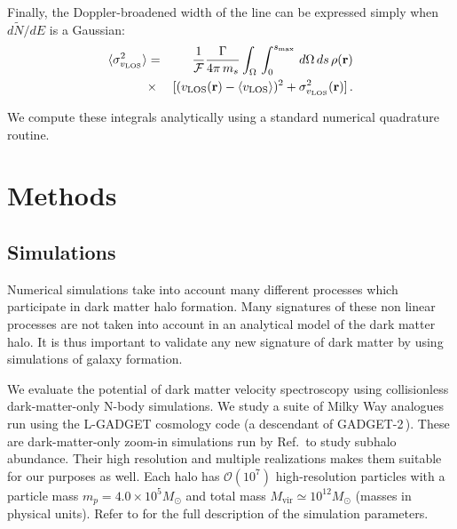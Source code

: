 \documentclass[aps,prd,10pt,twocolumn,superscriptaddress,showpacs,footinbib]{revtex4-1}
\newcommand{\br}[0]{\mathbf{r}}
\newcommand{\los}[0]{\mathrm{LOS}}
\begin{document}
Finally, the Doppler-broadened width of the line can be expressed simply when $d\tilde{N}/dE$ is a Gaussian:
\begin{eqnarray}
	\langle \sigma_{v_\los}^2 \rangle &=& \frac{1}{\mathcal{F}}\frac{\Gamma}{4\pi \, m_s} 
	\int _\Omega \, \int _0 ^{s_{\rm max}}  \, d\Omega\,ds \, \rho(\br)\nonumber \\ 
	&\times&   [(v_\los(\br)-\langle v_\los\rangle)^2+\sigma_{v_\los}^2(\br)] \, .
\label{eq:lineshift}
\end{eqnarray}

We compute these integrals analytically using a standard numerical quadrature routine.



\section{Methods}

\subsection{Simulations}
\label{sec:simulations}

Numerical simulations take into account many different processes which participate in dark matter halo formation.  Many signatures of these non linear processes are not taken into account in an analytical model of the dark matter halo.  It is thus important to validate any new signature of dark matter by using simulations of galaxy formation.

We evaluate the potential of dark matter velocity spectroscopy using collisionless dark-matter-only N-body
simulations.  We study a suite of Milky Way analogues run using the L-GADGET cosmology code (a
descendant of GADGET-2\,\cite{springel2005}). These are dark-matter-only zoom-in simulations run by
Ref.\,\cite{mao2015} to study subhalo abundance. Their high resolution and multiple realizations
makes them suitable for our purposes as well. Each halo has $\mathcal{O}(10^7)$ high-resolution
particles with a particle mass $m_p=4.0 \times 10^5 M_{\odot}$ and total  mass
$M_{\mathrm{vir}}\simeq 10^{12} M_{\odot}$ (masses in physical units). Refer to \cite{mao2015} for
the full description of the simulation parameters.
\end{document}
